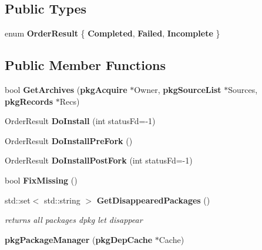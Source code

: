 \subsection*{\-Public \-Types}
\begin{DoxyCompactItemize}
\item 
enum {\bfseries \-Order\-Result} \{ {\bfseries \-Completed}, 
{\bfseries \-Failed}, 
{\bfseries \-Incomplete}
 \}
\end{DoxyCompactItemize}
\subsection*{\-Public \-Member \-Functions}
\begin{DoxyCompactItemize}
\item 
bool {\bfseries \-Get\-Archives} ({\bf pkg\-Acquire} $\ast$\-Owner, {\bf pkg\-Source\-List} $\ast$\-Sources, {\bf pkg\-Records} $\ast$\-Recs)\label{classpkgPackageManager_a2b59729e04855d013d966da40288d8c3}

\item 
\-Order\-Result {\bfseries \-Do\-Install} (int status\-Fd=-\/1)\label{classpkgPackageManager_a3f3e27cbb687107fbabe1929daf20e30}

\item 
\-Order\-Result {\bfseries \-Do\-Install\-Pre\-Fork} ()\label{classpkgPackageManager_ae371ab538d1f0b80412354c17a70cab2}

\item 
\-Order\-Result {\bfseries \-Do\-Install\-Post\-Fork} (int status\-Fd=-\/1)\label{classpkgPackageManager_a407dc479963d03d44bb89350a4cfa57b}

\item 
bool {\bfseries \-Fix\-Missing} ()\label{classpkgPackageManager_adddf5a984cb06e95a60139afe6339985}

\item 
std\-::set$<$ std\-::string $>$ {\bf \-Get\-Disappeared\-Packages} ()\label{classpkgPackageManager_ad212b9767d4f6a8cdaae07c6fcd14cc2}

\begin{DoxyCompactList}\small\item\em returns all packages dpkg let disappear \end{DoxyCompactList}\item 
{\bfseries pkg\-Package\-Manager} ({\bf pkg\-Dep\-Cache} $\ast$\-Cache)\label{classpkgPackageManager_a03a6dd5992c02b21b7cdb22295135b27}

\end{DoxyCompactItemize}
